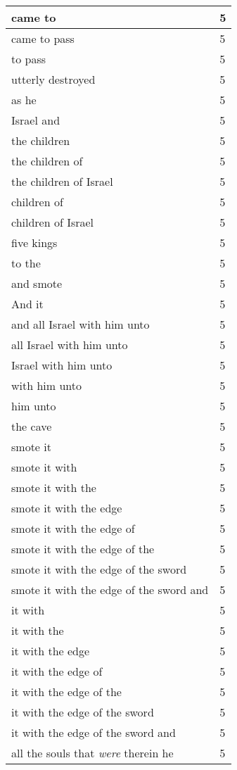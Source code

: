 \begin{center}
\begin{longtable}{|p{3.0in}|p{0.5in}|}
came to & 5\\ \hline 
came to pass & 5\\ \hline 
to pass & 5\\ \hline 
utterly destroyed & 5\\ \hline 
as he & 5\\ \hline 
Israel and & 5\\ \hline 
the children & 5\\ \hline 
the children of & 5\\ \hline 
the children of Israel & 5\\ \hline 
children of & 5\\ \hline 
children of Israel & 5\\ \hline 
five kings & 5\\ \hline 
to the & 5\\ \hline 
and smote & 5\\ \hline 
And it & 5\\ \hline 
and all Israel with him unto & 5\\ \hline 
all Israel with him unto & 5\\ \hline 
Israel with him unto & 5\\ \hline 
with him unto & 5\\ \hline 
him unto & 5\\ \hline 
the cave & 5\\ \hline 
smote it & 5\\ \hline 
smote it with & 5\\ \hline 
smote it with the & 5\\ \hline 
smote it with the edge & 5\\ \hline 
smote it with the edge of & 5\\ \hline 
smote it with the edge of the & 5\\ \hline 
smote it with the edge of the sword & 5\\ \hline 
smote it with the edge of the sword and & 5\\ \hline 
it with & 5\\ \hline 
it with the & 5\\ \hline 
it with the edge & 5\\ \hline 
it with the edge of & 5\\ \hline 
it with the edge of the & 5\\ \hline 
it with the edge of the sword & 5\\ \hline 
it with the edge of the sword and & 5\\ \hline 
all the souls that \emph{were} therein he & 5\\ \hline 

\end{longtable}
\end{center}
